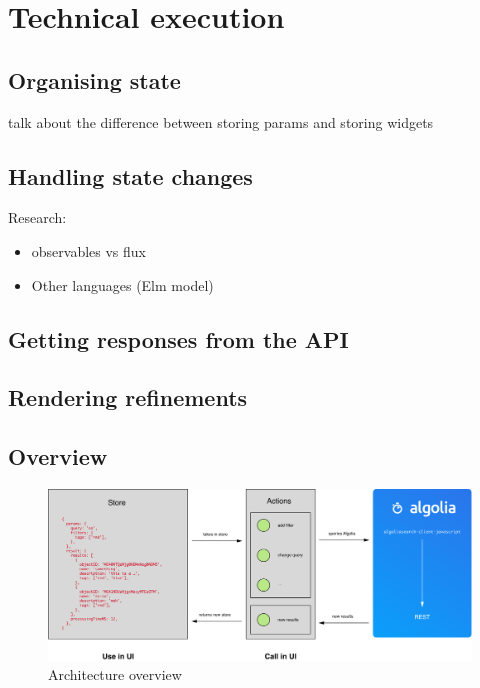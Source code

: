 
\chapter{Technical execution} %
\label{chp:execution}

\section{Organising state} %
\label{sec:organising_state}

talk about the difference between storing params and storing widgets


\section{Handling state changes} %
\label{sec:handling_state_changes}

Research:

\begin{itemize}
  \item observables vs flux
  \item Other languages (Elm model)
\end{itemize}


\section{Getting responses from the API} %
\label{sec:getting_responses_from_the_api}


\section{Rendering refinements} %
\label{sec:rendering_refinements}



\section{Overview} %
\label{sec:overview}

\begin{figure}[H]
  \label{figure:company-logo}
  \centering
  \includegraphics[width=\textwidth]{../assets/architecture.pdf}
  \caption{Architecture overview\cite{blog-architecture}}
\end{figure}

